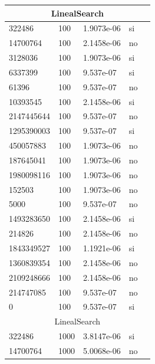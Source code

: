 \documentclass[12pt, fleqn]{article}                             %
\theoremstyle{break}                                            %
\begin{document}
        \begin{longtable}{|m{5em}|m{5em}|m{10em}|m{5em}|@{}m{0pt}@{}}
            \hline
            \multicolumn{5}{|c|}{LinealSearch}   \\          \hline
            322486& 100  & 1.9073e-06 & si &\\[1em]    \hline
            14700764& 100  & 2.1458e-06 & no &\\[1em]    \hline
            3128036& 100  & 1.9073e-06 & si &\\[1em]    \hline
            6337399& 100  & 9.537e-07 & si &\\[1em]    \hline
            61396& 100  & 9.537e-07 & no &\\[1em]    \hline
            10393545& 100  & 2.1458e-06 & si &\\[1em]    \hline
            2147445644& 100  & 9.537e-07 & no &\\[1em]    \hline
            1295390003& 100  & 9.537e-07 & si &\\[1em]    \hline
            450057883& 100  & 1.9073e-06 & no &\\[1em]    \hline
            187645041& 100  & 1.9073e-06 & no &\\[1em]    \hline
            1980098116& 100  & 1.9073e-06 & no &\\[1em]    \hline
            152503& 100  & 1.9073e-06 & no &\\[1em]    \hline
            5000& 100  & 9.537e-07 & no &\\[1em]    \hline
            1493283650& 100  & 2.1458e-06 & si &\\[1em]    \hline
            214826& 100  & 2.1458e-06 & no &\\[1em]    \hline
            1843349527& 100  & 1.1921e-06 & si &\\[1em]    \hline
            1360839354& 100  & 2.1458e-06 & no &\\[1em]    \hline
            2109248666& 100  & 2.1458e-06 & no &\\[1em]    \hline
            214747085& 100  & 9.537e-07 & no &\\[1em]    \hline
            0& 100  & 9.537e-07 & si &\\[1em]    \hline
            \multicolumn{5}{|c|}{LinealSearch}   \\          \hline
            322486& 1000  & 3.8147e-06 & si &\\[1em]    \hline
            14700764& 1000  & 5.0068e-06 & no &\\[1em]    \hline

\end{longtable}
\end{document}
